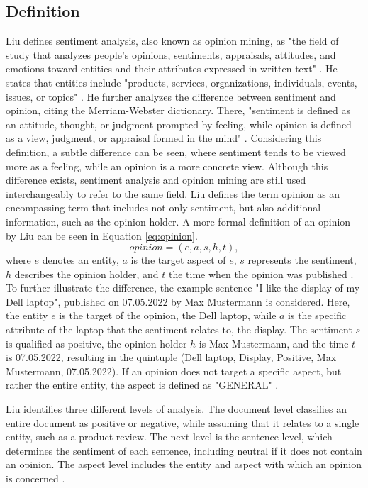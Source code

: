 \subsection{Definition}


Liu defines sentiment analysis, also known as opinion mining, as "the field of study that analyzes people's opinions, sentiments, appraisals, attitudes, and emotions toward entities and their attributes expressed in written text" \cite[p.~1]{liu_2015}. He states that entities include "products, services, organizations, individuals, events, issues, or topics" \cite[p.~1]{liu_2015}. He further analyzes the difference between sentiment and opinion, citing the Merriam-Webster dictionary. There, "sentiment is defined as an attitude, thought, or judgment prompted by feeling, while opinion is defined as a view, judgment, or appraisal formed in the mind" \cite[p.~2]{liu_2015}. Considering this definition, a subtle difference can be seen, where sentiment tends to be viewed more as a feeling, while an opinion is a more concrete view. Although this difference exists, sentiment analysis and opinion mining are still used interchangeably to refer to the same field. Liu defines the term opinion as an encompassing term that includes not only sentiment, but also additional information, such as the opinion holder. A more formal definition of an opinion by Liu can be seen in Equation \eqref{eq:opinion}.
\begin{equation}
    opinion = (e, a, s, h, t),
    \label{eq:opinion}
\end{equation}
where $e$ denotes an entity, $a$ is the target aspect of $e$, $s$ represents the sentiment, $h$ describes the opinion holder, and $t$ the time when the opinion was published \cite{liu_2015}. To further illustrate the difference, the example sentence "I like the display of my Dell laptop", published on 07.05.2022 by Max Mustermann is considered. Here, the entity $e$ is the target of the opinion, the Dell laptop, while $a$ is the specific attribute of the laptop that the sentiment relates to, the display. The sentiment $s$ is qualified as positive, the opinion holder $h$ is Max Mustermann, and the time $t$ is 07.05.2022, resulting in the quintuple (Dell laptop, Display, Positive, Max Mustermann, 07.05.2022). If an opinion does not target a specific aspect, but rather the entire entity, the aspect is defined as "GENERAL" \cite{liu_2015}. 


Liu identifies three different levels of analysis. The document level classifies an entire document as positive or negative, while assuming that it relates to a single entity, such as a product review. The next level is the sentence level, which determines the sentiment of each sentence, including neutral if it does not contain an opinion. The aspect level includes the entity and aspect with which an opinion is concerned \cite{liu_2015}.

